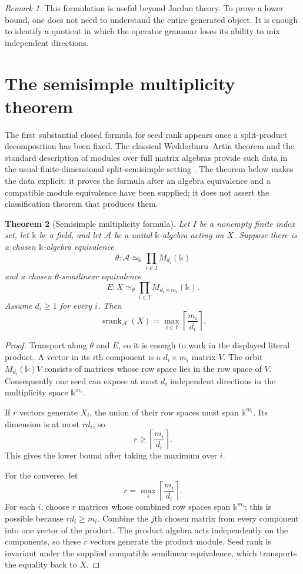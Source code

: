 \documentclass[11pt]{article}
\newtheorem{theorem}{Theorem}[section]
\theoremstyle{definition}
\theoremstyle{remark}
\newtheorem{remark}[theorem]{Remark}
\newcommand{\cA}{\mathcal A}
\newcommand{\srank}{\operatorname{srank}}
\newcommand{\bbk}{\mathbb{k}}
\begin{document}
\begin{remark}
This formulation is useful beyond Jordan theory. To prove a lower bound, one does not need to understand the entire generated object. It is enough to identify a quotient in which the operator grammar loses its ability to mix independent directions.
\end{remark}

\section{The semisimple multiplicity theorem}

The first substantial closed formula for seed rank appears once a split-product decomposition has been fixed. The classical Wedderburn--Artin theorem and the standard description of modules over full matrix algebras provide such data in the usual finite-dimensional split-semisimple setting \cite{lam2001noncommutative}\cite{lam1999modules}. The theorem below makes the data explicit: it proves the formula after an algebra equivalence and a compatible module equivalence have been supplied; it does not assert the classification theorem that produces them.

\begin{theorem}[Semisimple multiplicity formula]
\label{thm:semisimple}
Let $I$ be a nonempty finite index set, let $\bbk$ be a field, and let $\cA$ be a unital $\bbk$-algebra acting on $X$. Suppose there is a chosen $\bbk$-algebra equivalence
\[
\theta:\cA\simeq_{\bbk}\prod_{i\in I}M_{d_i}(\bbk)
\]
and a chosen $\theta$-semilinear equivalence
\[
E:X\simeq_{\theta}\prod_{i\in I}M_{d_i\times m_i}(\bbk).
\]
Assume $d_i\ge1$ for every $i$. Then
\[
{
\srank_{\cA}(X)
=
\max_{i\in I}
\left\lceil\frac{m_i}{d_i}\right\rceil.
}
\]
\end{theorem}

\begin{proof}
Transport along $\theta$ and $E$, so it is enough to work in the displayed literal product. A vector in its $i$th component is a $d_i\times m_i$ matrix $V$. The orbit $M_{d_i}(\bbk)V$ consists of matrices whose row space lies in the row space of $V$. Consequently one seed can expose at most $d_i$ independent directions in the multiplicity space $\bbk^{m_i}$.

If $r$ vectors generate $X_i$, the union of their row spaces must span $\bbk^{m_i}$. Its dimension is at most $rd_i$, so
\[
r\ge\left\lceil\frac{m_i}{d_i}\right\rceil.
\]
This gives the lower bound after taking the maximum over $i$.

For the converse, let
\[
r=\max_i\left\lceil\frac{m_i}{d_i}\right\rceil.
\]
For each $i$, choose $r$ matrices whose combined row spaces span $\bbk^{m_i}$; this is possible because $rd_i\ge m_i$. Combine the $j$th chosen matrix from every component into one vector of the product. The product algebra acts independently on the components, so these $r$ vectors generate the product module. Seed rank is invariant under the supplied compatible semilinear equivalence, which transports the equality back to $X$.
\end{proof}
\end{document}
